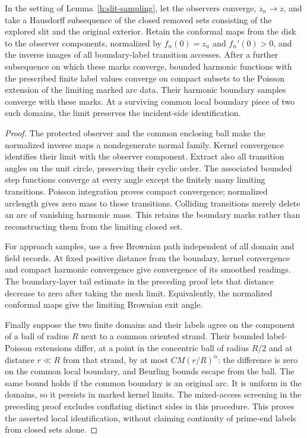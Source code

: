 \begin{lemma}\label{h:marked-limits}
In the setting of Lemma~\ref{h:slit-sampling}, let the observers
converge, $z_n\to z$, and take a Hausdorff subsequence
of the closed removed sets consisting of the explored slit and the
original exterior. Retain the conformal maps from the disk to the
observer components, normalized by $f_n(0)=z_n$ and $f_n'(0)>0$,
and the inverse images of all boundary-label transition accesses.
After a further subsequence on which these marks converge,
bounded harmonic functions with the prescribed finite
label values converge on compact subsets to the Poisson
extension of the limiting marked arc data. Their harmonic
boundary samples converge with these marks. At a surviving
common local boundary piece of two such domains, the limit
preserves the incident-side identification.
\end{lemma}
\begin{proof}
The protected observer and the common enclosing ball make the
normalized inverse maps a nondegenerate normal family. Kernel
convergence identifies their limit with the observer component.
Extract also all transition angles on the unit circle, preserving
their cyclic order. The associated bounded step functions converge
at every angle except the finitely many limiting transitions.
Poisson integration proves compact convergence; normalized
arclength gives zero mass to those transitions. Colliding
transitions merely delete an arc of vanishing harmonic mass.
This retains the boundary marks rather than reconstructing
them from the limiting closed set.

For approach samples, use a free Brownian path independent of
all domain and field records. At fixed positive distance from
the boundary, kernel convergence and compact harmonic convergence
give convergence of its smoothed readings. The boundary-layer
tail estimate in the preceding proof lets that distance decrease
to zero after taking the mesh limit. Equivalently, the normalized
conformal maps give the limiting Brownian exit angle.

Finally suppose the two finite domains and their labels agree
on the component of a ball of radius $R$ next to a common
oriented strand. Their bounded label-Poisson extensions differ,
at a point in the concentric ball of radius $R/2$ and at distance
$r\ll R$ from that strand, by at most
$CM(r/R)^\alpha$: the difference is zero on the common local
boundary, and Beurling bounds escape from the ball.
The same bound holds if the common boundary is an original
arc. It is uniform in the domains, so it persists in marked
kernel limits. The mixed-access screening in the preceding
proof excludes conflating distinct sides in this procedure.
This proves the asserted local identification, without
claiming continuity of prime-end labels from closed sets alone.
\end{proof}

